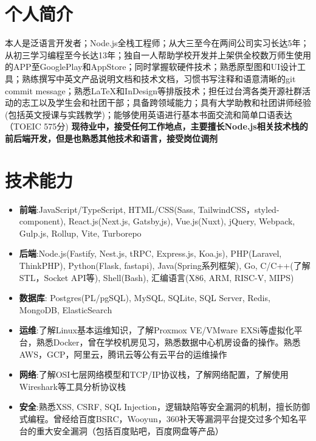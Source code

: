 \documentclass{resume}
\begin{document}



\section{ 个人简介}
    本人是泛语言开发者；Node.js全栈工程师；从大三至今在两间公司实习长达5年；从初三学习编程至今长达13年；独自一人帮助学校开发并上架供全校数万师生使用的APP至GooglePlay和AppStore；同时掌握软硬件技术；熟悉原型图和UI设计工具；熟练撰写中英文产品说明文档和技术文档，习惯书写注释和语意清晰的git commit message；熟悉\LaTeX 和InDesign等排版技术；担任过台湾各类开源社群活动的志工以及学生会和社团干部；具备跨领域能力；具有大学助教和社团讲师经验(包括英文授课与实践教学)；能够使用英语进行基本书面交流和简单口语表达（TOEIC 575分)
    \newline \textbf{现待业中，接受任何工作地点，主要擅长Node.js相关技术栈的前后端开发，但是也熟悉其他技术和语言，接受岗位调剂}

\section{ 技术能力}
    \begin{itemize}
      \item \textbf{前端}:JavaScript/TypeScript, HTML/CSS(Sass, TailwindCSS，styled-component), React.js(Next.js, Gatsby,js), Vue.js(Nuxt), jQuery, Webpack, Gulp.js, Rollup, Vite, Turborepo
      \item \textbf{后端}:Node.js(Fastify, Nest.js, tRPC, Express.js, Koa.js), PHP(Laravel, ThinkPHP), Python(Flask, fastapi), Java(Spring系列框架), Go, C/C++(了解STL，Socket API等), Shell(Bash), 汇编语言(X86, ARM, RISC-V, MIPS)
      \item \textbf{数据库}: Postgres(PL/pgSQL), MySQL, SQLite, SQL Server, Redis, MongoDB, ElasticSearch
      \item \textbf{运维}:了解Linux基本运维知识，了解Proxmox VE/VMware EXSi等虚拟化平台，熟悉Docker，曾在学校机房见习，熟悉数据中心机房设备的操作。熟悉AWS，GCP，阿里云，腾讯云等公有云平台的运维操作
      \item \textbf{网络}:了解OSI七层网络模型和TCP/IP协议栈，了解网络配置，了解使用Wireshark等工具分析协议栈
      \item \textbf{安全}:熟悉XSS, CSRF, SQL Injection，逻辑缺陷等安全漏洞的机制，擅长防御式编程。曾经给百度BSRC，Wooyun，360补天等漏洞平台提交过多个知名平台的重大安全漏洞（包括百度贴吧，百度网盘等产品）
    \end{itemize}
\end{document}
